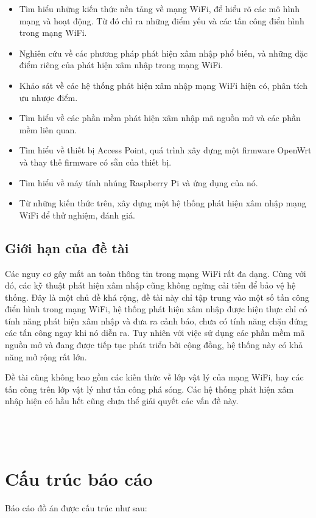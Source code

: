\begin{itemize}
\item Tìm hiểu những kiến thức nền tảng về mạng WiFi, để hiểu rõ các mô hình mạng và hoạt động. Từ đó chỉ ra những điểm yếu và các tấn công điển hình trong mạng WiFi.
\item Nghiên cứu về các phương pháp phát hiện xâm nhập phổ biến, và những đặc điểm riêng của phát hiện xâm nhập trong mạng WiFi.
\item Khảo sát về các hệ thống phát hiện xâm nhập mạng WiFi hiện có, phân tích ưu nhược điểm.
\item Tìm hiểu về các phần mềm phát hiện xâm nhập mã nguồn mở và các phần mềm liên quan.
\item Tìm hiểu về thiết bị Access Point, quá trình xây dựng một firmware OpenWrt và thay thế firmware có sẵn của thiết bị.
\item Tìm hiểu về máy tính nhúng Raspberry Pi và ứng dụng của nó.
\item Từ những kiến thức trên, xây dựng một hệ thống phát hiện xâm nhập mạng WiFi để thử nghiệm, đánh giá.
\end{itemize}

\subsection{Giới hạn của đề tài}
Các nguy cơ gây mất an toàn thông tin trong mạng WiFi rất đa dạng. Cùng với đó, các kỹ thuật phát hiện xâm nhập cũng không ngừng cải tiến để bảo vệ hệ thống. Đây là một chủ đề khá rộng, đề tài này chỉ tập trung vào một số tấn công điển hình trong mạng WiFi, hệ thống phát hiện xâm nhập được hiện thực chỉ có tính năng phát hiện xâm nhập và đưa ra cảnh báo, chưa có tính năng chặn đứng các tấn công ngay khi nó diễn ra. Tuy nhiên với việc sử dụng các phần mềm mã nguồn mở và đang được tiếp tục phát triển bởi cộng đồng, hệ thống này có khả năng mở rộng rất lớn.

Đề tài cũng không bao gồm các kiến thức về lớp vật lý của mạng WiFi, hay các tấn công trên lớp vật lý như tấn công phá sóng. Các hệ thống phát hiện xâm nhập hiện có hầu hết cũng chưa thể giải quyết các vấn đề này.\\ \\ \\ \\

\section{Cấu trúc báo cáo}
Báo cáo đồ án được cấu trúc như sau:

